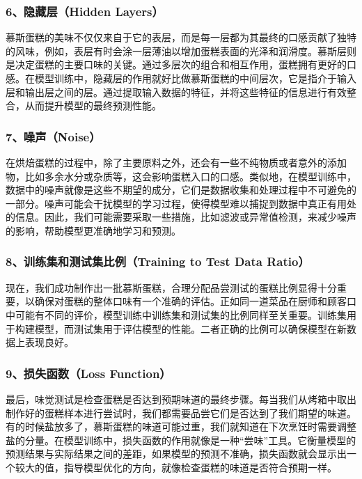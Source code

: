 \subsubsection{6、隐藏层（Hidden Layers）}

慕斯蛋糕的美味不仅仅来自于它的表层，而是每一层都为其最终的口感贡献了独特的风味，例如，表层有时会涂一层薄油以增加蛋糕表面的光泽和润滑度。慕斯层则是决定蛋糕的主要口味的关键。通过多层次的组合和相互作用，蛋糕拥有更好的口感。在模型训练中，隐藏层的作用就好比做慕斯蛋糕的中间层次，它是指介于输入层和输出层之间的层。通过提取输入数据的特征，并将这些特征的信息进行有效整合，从而提升模型的最终预测性能。

\subsubsection{7、噪声（Noise）}

在烘焙蛋糕的过程中，除了主要原料之外，还会有一些不纯物质或者意外的添加物，比如多余水分或杂质等，这会影响蛋糕入口的口感。类似地，在模型训练中，数据中的噪声就像是这些不期望的成分，它们是数据收集和处理过程中不可避免的一部分。噪声可能会干扰模型的学习过程，使得模型难以捕捉到数据中真正有用处的信息。因此，我们可能需要采取一些措施，比如滤波或异常值检测，来减少噪声的影响，帮助模型更准确地学习和预测。

\subsubsection{8、训练集和测试集比例（Training to Test Data Ratio）}

现在，我们成功制作出一批慕斯蛋糕，合理分配品尝测试的蛋糕比例显得十分重要，以确保对蛋糕的整体口味有一个准确的评估。正如同一道菜品在厨师和顾客口中可能有不同的评价，模型训练中训练集和测试集的比例同样至关重要。训练集用于构建模型，而测试集用于评估模型的性能。二者正确的比例可以确保模型在新数据上表现良好。

\subsubsection{9、损失函数（Loss Function）}

最后，味觉测试是检查蛋糕是否达到预期味道的最终步骤。每当我们从烤箱中取出制作好的蛋糕样本进行尝试时，我们都需要品尝它们是否达到了我们期望的味道。有的时候盐放多了，慕斯蛋糕的味道可能过重，我们就知道在下次烹饪时需要调整盐的分量。在模型训练中，损失函数的作用就像是一种“尝味”工具。它衡量模型的预测结果与实际结果之间的差距，如果模型的预测不准确，损失函数就会显示出一个较大的值，指导模型优化的方向，就像检查蛋糕的味道是否符合预期一样。

